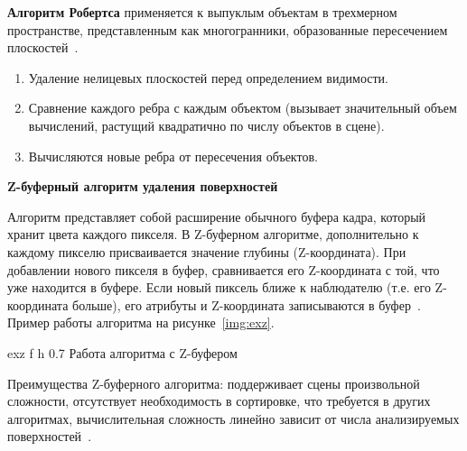 \textbf{Алгоритм Робертса} применяется к выпуклым объектам в трехмерном пространстве, представленным как многогранники, образованные пересечением плоскостей~\cite{del_line}.

\begin{enumerate}
	\item Удаление нелицевых плоскостей перед определением видимости.
	\item Сравнение каждого ребра с каждым объектом (вызывает значительный объем вычислений, растущий квадратично по числу объектов в сцене).
	\item Вычисляются новые ребра от пересечения объектов. 
\end{enumerate}
	





\textbf{Z-буферный алгоритм удаления поверхностей}

Алгоритм представляет собой расширение обычного буфера кадра, который хранит цвета каждого пикселя.
В Z-буферном алгоритме, дополнительно к каждому пикселю присваивается значение глубины (Z-координата).
При добавлении нового пикселя в буфер, сравнивается его Z-координата с той, что уже находится в буфере.
Если новый пиксель ближе к наблюдателю (т.е. его Z-координата больше), его атрибуты и Z-координата записываются в буфер~\cite{del_line}.
Пример работы алгоритма на рисунке~\ref{img:exz}. 

	{exz} %
	{f} %
	{h} %
	{0.7\textwidth} %
	{Работа алгоритма с Z-буфером} %


Преимущества Z-буферного алгоритма: поддерживает сцены произвольной сложности,
отсутствует необходимость в сортировке, что требуется в других алгоритмах,
вычислительная сложность линейно зависит от числа анализируемых поверхностей~\cite{del_line}.


